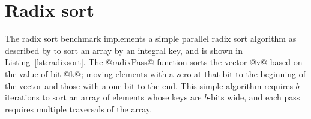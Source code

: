 \section{Radix sort}

The radix sort benchmark implements a simple parallel radix sort algorithm as
described by \citet{Blelloch:1990vl} to sort an array by an integral key, and is
shown in Listing~\ref{lst:radixsort}.
The @radixPass@ function sorts the vector @v@ based on the value of
bit @k@; moving elements with a zero at that bit to the beginning of the
vector and those with a one bit to the end. This simple algorithm requires
$b$ iterations to sort an array of elements whose keys are $b$-bits wide, and
each pass requires multiple traversals of the array.


